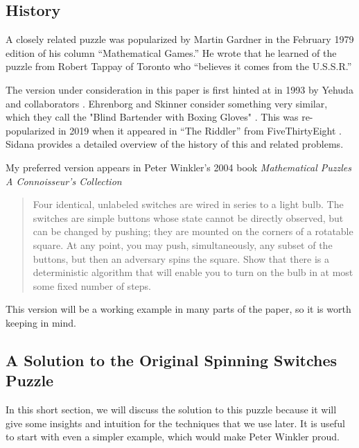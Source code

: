 \subsection{History}
A closely related puzzle was popularized by Martin Gardner in the
February 1979 edition of his column ``Mathematical Games.'' \cite{Gardner1979Problem}
He wrote that he learned of the puzzle from Robert Tappay of Toronto who
``believes it comes from the U.S.S.R.''

The version under consideration in this paper is first hinted at in 1993
by Yehuda and collaborators \cite{Yehuda1993}.
Ehrenborg and Skinner consider something very similar, which they call the
"Blind Bartender with Boxing Gloves" \cite{Ehrenborg1995}.
This was re-popularized in 2019 when it appeared in ``The Riddler'' from
FiveThirtyEight \cite{FiveThirtyEight}.
Sidana \cite{Sidana2020} provides a detailed overview of the history of this
and related problems.

My preferred version appears in Peter Winkler's 2004 book
\textit{Mathematical Puzzles A Connoisseur's Collection}
\begin{quote}
  Four identical, unlabeled switches are wired in series to a light bulb.
  The switches are simple buttons whose state cannot be directly observed,
  but can be changed by pushing; they are mounted on the corners of a
  rotatable square. At any point, you may push, simultaneously, any subset
  of the buttons, but then an adversary spins the square. Show that there
  is a deterministic algorithm that will enable you to turn on the bulb in
  at most some fixed number of steps. \cite{Winkler2004}
\end{quote}

This version will be a working example in many parts of the paper, so it is
worth keeping in mind.

\subsection{A Solution to the Original Spinning Switches Puzzle}

In this short section, we will discuss the solution to this puzzle because it
will give some insights and intuition for the techniques that we use later.
It is useful to start with even a simpler example, which would make Peter
Winkler proud.

